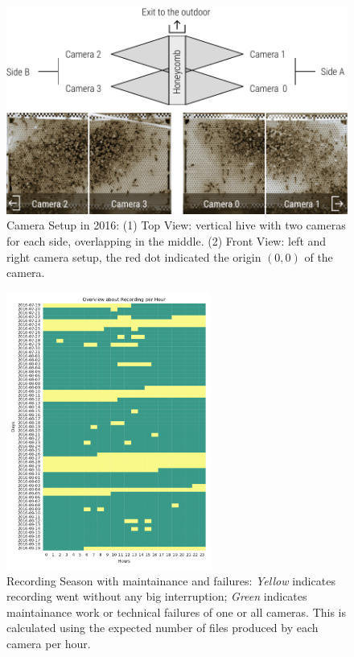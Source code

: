\begin{figure}[htb]
	\centering
	\includegraphics[width=1.0\textwidth]{Figures/setupCams}
	\caption{Camera Setup in 2016: (1) Top View:  vertical hive with two cameras for each side, overlapping in the middle. (2) Front View: left and right camera setup, the red dot indicated the origin $(0,0)$ of the camera.}
	\label{fig:cams}
\end{figure}

\begin{figure}[htb]
	\centering
	\includegraphics[width=0.6\textwidth]{Figures/recording}
	\caption[Recording Season]{Recording Season with maintainance and failures: \emph{Yellow} indicates recording went without any big interruption; \emph{Green} indicates maintainance work or technical failures of one or all cameras. This is calculated using the expected number of files produced by each camera per hour.}
	\label{fig:period}
\end{figure}

